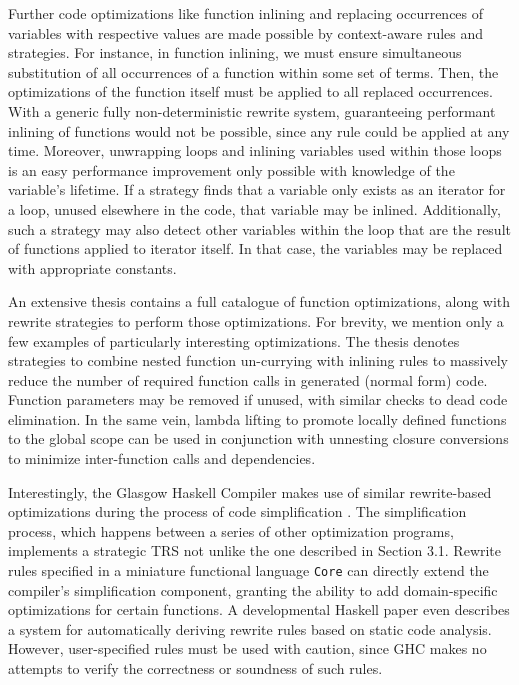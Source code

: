 \documentclass{article}
\begin{document}
Further code optimizations like function inlining and replacing occurrences of variables with respective values
are made possible by context-aware rules and strategies. For instance, in function inlining, we must ensure
simultaneous substitution of all occurrences of a function within some set of terms.
Then, the optimizations of the function itself must be applied to all replaced occurrences.
With a generic fully non-deterministic rewrite system, guaranteeing performant inlining of functions would
not be possible, since any rule could be applied at any time.
Moreover, unwrapping loops
and inlining variables used within those loops is an easy performance improvement only possible with knowledge of the variable's lifetime.
If a strategy finds that a variable only exists as an iterator for a loop, unused elsewhere in the code, that variable may be inlined.
Additionally, such a strategy may also detect other variables within the loop that are the result of functions applied to iterator itself.
In that case, the variables may be replaced with appropriate constants.

An extensive thesis \cite{paraskevopoulou2020verified} contains a full catalogue of function optimizations,
along with rewrite strategies to perform those optimizations.
For brevity, we mention only a few examples of particularly interesting optimizations.
The thesis denotes strategies to combine nested function un-currying with inlining rules
to massively reduce the number of required function calls in generated (normal form) code.
Function parameters may be removed if unused, with similar checks to dead code elimination.
In the same vein, lambda lifting to promote locally defined functions to the global scope can be used in conjunction with unnesting closure conversions
to minimize inter-function calls and dependencies.

Interestingly, the Glasgow Haskell Compiler makes use of similar rewrite-based optimizations during the process of code simplification \cite{brown2011architecture}.
The simplification process, which happens between a series of other optimization programs, implements a strategic TRS not unlike the one described in Section 3.1.
Rewrite rules specified in a miniature functional language \texttt{Core} can directly extend the compiler's simplification component,
granting the ability to add domain-specific optimizations for certain functions.
A developmental Haskell paper \cite{peytonjones2001playing} even describes a system for automatically deriving rewrite rules based on static code analysis.
However, user-specified rules must be used with caution,
since GHC makes no attempts to verify the correctness or soundness of such rules.
\end{document}
